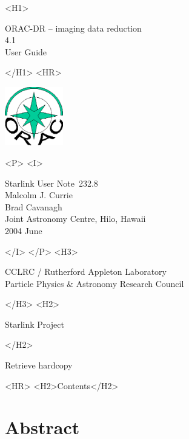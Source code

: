 \documentclass[twoside,11pt]{article}
\newcommand{\stardoccategory}  {Starlink User Note}
\newcommand{\stardocsource}    {sun\stardocnumber}
\newcommand{\stardocnumber}    {232.8}
\newcommand{\stardocauthors}   {Malcolm J. Currie\\
                               Brad Cavanagh\\
                               Joint Astronomy Centre, Hilo, Hawaii}
\newcommand{\stardocdate}      {2004 June}
\newcommand{\stardoctitle}     {ORAC-DR -- imaging data reduction}
\newcommand{\stardocversion}   {4.1}
\newcommand{\stardocmanual}    {User Guide}
\newcommand{\htmladdnormallink}[2]{#1}
\newcommand{\htmladdimg}[1]{}
\newcommand{\htmlref}[2]{#1}
\newcommand{\htmladdtonavigation}[1]{}
\newcommand{\xlabel}[1]{}
\renewcommand{\_}{\texttt{\symbol{95}}}
\begin{document}
\begin{htmlonly}
   \xlabel{}
   \begin{rawhtml} <H1> \end{rawhtml}
      \stardoctitle\\
      \stardocversion\\
      \stardocmanual
   \begin{rawhtml} </H1> <HR> \end{rawhtml}

\includegraphics[width=1.0in]{sun232_logo.eps}

   \begin{rawhtml} <P> <I> \end{rawhtml}
   \stardoccategory\ \stardocnumber \\
   \stardocauthors \\
   \stardocdate
   \begin{rawhtml} </I> </P> <H3> \end{rawhtml}
      \htmladdnormallink{CCLRC / Rutherford Appleton Laboratory}
                        {http://www.cclrc.ac.uk} \\
      \htmladdnormallink{Particle Physics \& Astronomy Research Council}
                        {http://www.pparc.ac.uk} \\
   \begin{rawhtml} </H3> <H2> \end{rawhtml}
      \htmladdnormallink{Starlink Project}{http://www.starlink.rl.ac.uk/}
   \begin{rawhtml} </H2> \end{rawhtml}
   \htmladdnormallink{\htmladdimg{source.gif} Retrieve hardcopy}
      {http://www.starlink.rl.ac.uk/cgi-bin/hcserver?\stardocsource}\\

  \label{stardoccontents}
  \begin{rawhtml} 
    <HR>
    <H2>Contents</H2>
  \end{rawhtml}
  \htmladdtonavigation{\htmlref{\htmladdimg{contents_motif.gif}}
        {stardoccontents}}

  \section{\xlabel{abstract}Abstract}
\end{htmlonly}
\end{document}
